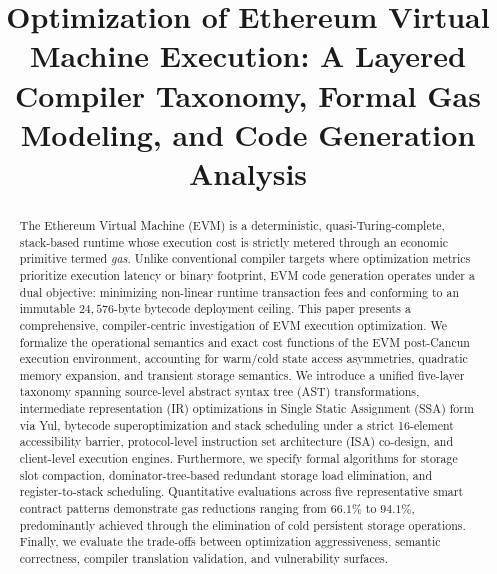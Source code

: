 \documentclass[conference]{IEEEtran}
\begin{document}
\title{Optimization of Ethereum Virtual Machine Execution: A Layered Compiler Taxonomy, Formal Gas Modeling, and Code Generation Analysis}

\author{
}

\maketitle

\begin{abstract}
The Ethereum Virtual Machine (EVM) is a deterministic, quasi-Turing-complete, stack-based runtime whose execution cost is strictly metered through an economic primitive termed \emph{gas}. Unlike conventional compiler targets where optimization metrics prioritize execution latency or binary footprint, EVM code generation operates under a dual objective: minimizing non-linear runtime transaction fees and conforming to an immutable $24,576$-byte bytecode deployment ceiling. This paper presents a comprehensive, compiler-centric investigation of EVM execution optimization. We formalize the operational semantics and exact cost functions of the EVM post-Cancun execution environment, accounting for warm/cold state access asymmetries, quadratic memory expansion, and transient storage semantics. We introduce a unified five-layer taxonomy spanning source-level abstract syntax tree (AST) transformations, intermediate representation (IR) optimizations in Single Static Assignment (SSA) form via Yul, bytecode superoptimization and stack scheduling under a strict 16-element accessibility barrier, protocol-level instruction set architecture (ISA) co-design, and client-level execution engines. Furthermore, we specify formal algorithms for storage slot compaction, dominator-tree-based redundant storage load elimination, and register-to-stack scheduling. Quantitative evaluations across five representative smart contract patterns demonstrate gas reductions ranging from $66.1\%$ to $94.1\%$, predominantly achieved through the elimination of cold persistent storage operations. Finally, we evaluate the trade-offs between optimization aggressiveness, semantic correctness, compiler translation validation, and vulnerability surfaces.
\end{abstract}
\end{document}
